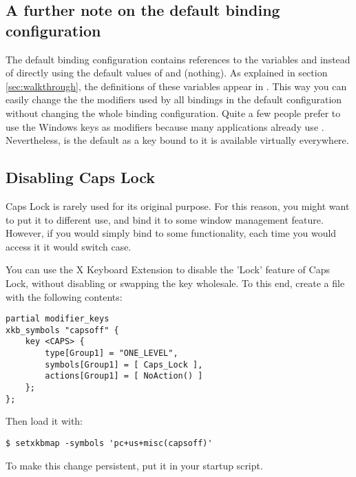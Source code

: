 \subsection{A further note on the default binding configuration}

The default binding configuration contains references to the variables
 and  instead of directly using the default
values of  and \codestr{} (nothing). As explained in
section \ref{sec:walkthrough}, the definitions of these variables
appear in . This way you can easily change the the
modifiers used by all bindings in the default configuration without 
changing the whole binding configuration. Quite a few people prefer 
to use the Windows keys as modifiers because many applications already
use . Nevertheless,  is the default as a key bound 
to it is available virtually everywhere.

\subsection{Disabling Caps Lock}

Caps Lock is rarely used for its original purpose. For this reason, you
might want to put it to different use, and bind it to some window management
feature. However, if you would simply bind  to some
functionality, each time you would access it it would switch case.

You can use the X Keyboard Extension to disable the 'Lock' feature of
Caps Lock, without disabling or swapping the key wholesale. To this end,
create a  file with the following
contents:

\begin{verbatim}
partial modifier_keys
xkb_symbols "capsoff" {
    key <CAPS> {
        type[Group1] = "ONE_LEVEL",
        symbols[Group1] = [ Caps_Lock ],
        actions[Group1] = [ NoAction() ]
    };
};
\end{verbatim}

Then load it with:

\begin{verbatim}
$ setxkbmap -symbols 'pc+us+misc(capsoff)'
\end{verbatim}

To make this change persistent, put it in your startup script.

